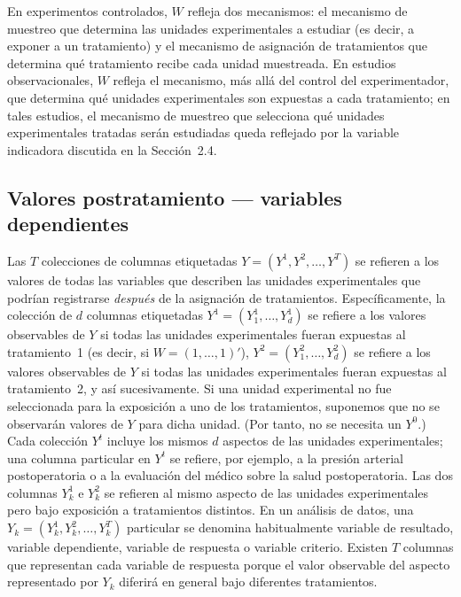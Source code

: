 \documentclass[12pt,a4paper]{article}
\begin{document}
En experimentos controlados, $W$ refleja dos mecanismos: el mecanismo de muestreo que
determina las unidades experimentales a estudiar (es decir, a exponer a un tratamiento) y
el mecanismo de asignación de tratamientos que determina qué tratamiento recibe cada
unidad muestreada. En estudios observacionales, $W$ refleja el mecanismo, más allá del
control del experimentador, que determina qué unidades experimentales son expuestas a cada
tratamiento; en tales estudios, el mecanismo de muestreo que selecciona qué unidades
experimentales tratadas serán estudiadas queda reflejado por la variable indicadora
discutida en la Sección~2.4.

\subsection{Valores postratamiento --- variables dependientes}

Las $T$ colecciones de columnas etiquetadas $Y = (Y^1, Y^2, \ldots, Y^T)$ se refieren a
los valores de todas las variables que describen las unidades experimentales que podrían
registrarse \textit{después} de la asignación de tratamientos. Específicamente, la
colección de $d$ columnas etiquetadas $Y^1 = (Y^1_1, \ldots, Y^1_d)$ se refiere a los
valores observables de $Y$ si todas las unidades experimentales fueran expuestas al
tratamiento~1 (es decir, si $W = (1,\ldots,1)'$), $Y^2 = (Y^2_1, \ldots, Y^2_d)$ se
refiere a los valores observables de $Y$ si todas las unidades experimentales fueran
expuestas al tratamiento~2, y así sucesivamente. Si una unidad experimental no fue
seleccionada para la exposición a uno de los tratamientos, suponemos que no se observarán
valores de $Y$ para dicha unidad. (Por tanto, no se necesita un $Y^0$.) Cada colección
$Y^t$ incluye los mismos $d$ aspectos de las unidades experimentales; una columna
particular en $Y^t$ se refiere, por ejemplo, a la presión arterial postoperatoria o a la
evaluación del médico sobre la salud postoperatoria. Las dos columnas $Y^1_k$ e $Y^2_k$
se refieren al mismo aspecto de las unidades experimentales pero bajo exposición a
tratamientos distintos. En un análisis de datos, una $Y_k = (Y^1_k, Y^2_k, \ldots,
Y^T_k)$ particular se denomina habitualmente variable de resultado, variable dependiente,
variable de respuesta o variable criterio. Existen $T$ columnas que representan cada
variable de respuesta porque el valor observable del aspecto representado por $Y_k$
diferirá en general bajo diferentes tratamientos.
\end{document}
